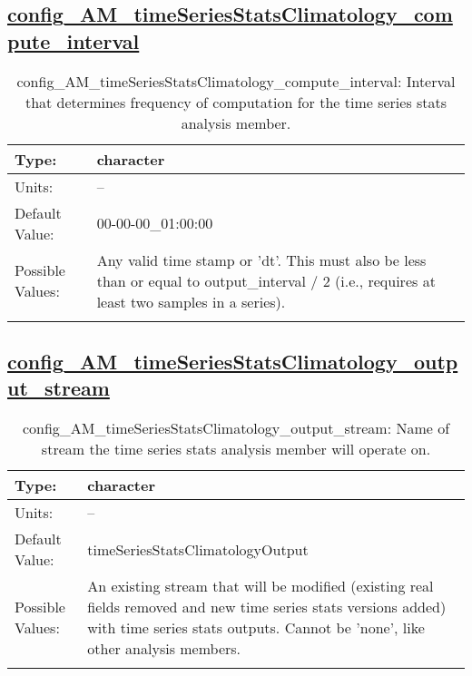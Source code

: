 \subsection[config\_AM\_timeSeriesStatsClimatology\_compute\_interval]{\hyperref[sec:nm_tab_AM_timeSeriesStatsClimatology]{config\_AM\_timeSeriesStatsClimatology\_compute\_interval}}
\label{subsec:nm_sec_config_AM_timeSeriesStatsClimatology_compute_interval}
\begin{center}
\begin{longtable}{| p{2.0in} || p{4.0in} |}
    \hline
    Type: & character \\
    \hline
    Units: & -- \\
    \hline
    Default Value: & 00-00-00\_01:00:00 \\
    \hline
    Possible Values: & Any valid time stamp or 'dt'. This must also be less than or equal to output\_interval / 2 (i.e., requires at least two samples in a series). \\
    \hline
    \caption{config\_AM\_timeSeriesStatsClimatology\_compute\_interval: Interval that determines frequency of computation for the time series stats analysis member.}
\end{longtable}
\end{center}
\subsection[config\_AM\_timeSeriesStatsClimatology\_output\_stream]{\hyperref[sec:nm_tab_AM_timeSeriesStatsClimatology]{config\_AM\_timeSeriesStatsClimatology\_output\_stream}}
\label{subsec:nm_sec_config_AM_timeSeriesStatsClimatology_output_stream}
\begin{center}
\begin{longtable}{| p{2.0in} || p{4.0in} |}
    \hline
    Type: & character \\
    \hline
    Units: & -- \\
    \hline
    Default Value: & timeSeriesStatsClimatologyOutput \\
    \hline
    Possible Values: & An existing stream that will be modified (existing real fields removed and new time series stats versions added) with time series stats outputs. Cannot be 'none', like other analysis members. \\
    \hline
    \caption{config\_AM\_timeSeriesStatsClimatology\_output\_stream: Name of stream the time series stats analysis member will operate on.}
\end{longtable}
\end{center}
